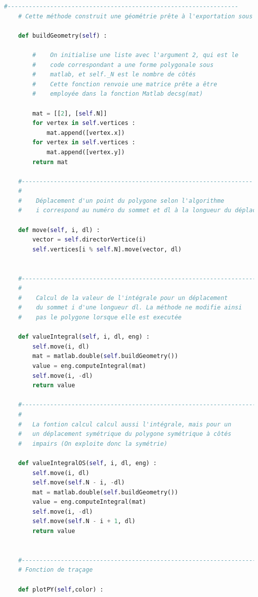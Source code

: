 \documentclass[a4paper,reqno]{article}
\begin{document}
\begin{lstlisting}[language=Python,frame=single,caption=Création de la classe Polygon]
    #-----------------------------------------------------------------
    # Cette méthode construit une géométrie prête à l'exportation sous matlab

    def buildGeometry(self) :

        #    On initialise une liste avec l'argument 2, qui est le 
        #    code correspondant a une forme polygonale sous 
        #    matlab, et self._N est le nombre de côtés
 		#    Cette fonction renvoie une matrice prête a être 
 		#    employée dans la fonction Matlab decsg(mat)

        mat = [[2], [self.N]]
        for vertex in self.vertices :
            mat.append([vertex.x])
        for vertex in self.vertices :
            mat.append([vertex.y])
        return mat

    #-----------------------------------------------------------------
    #
    #    Déplacement d'un point du polygone selon l'algorithme
    #    i correspond au numéro du sommet et dl à la longueur du déplacement

    def move(self, i, dl) :
        vector = self.directorVertice(i)
        self.vertices[i % self.N].move(vector, dl)


    #------------------------------------------------------------------
    #
    #    Calcul de la valeur de l'intégrale pour un déplacement
    #    du sommet i d'une longueur dl. La méthode ne modifie ainsi
    #    pas le polygone lorsque elle est executée

    def valueIntegral(self, i, dl, eng) :
        self.move(i, dl)
        mat = matlab.double(self.buildGeometry())
        value = eng.computeIntegral(mat)
        self.move(i, -dl)
        return value

    #-------------------------------------------------------------------
    #
    #   La fontion calcul calcul aussi l'intégrale, mais pour un
    #   un déplacement symétrique du polygone symétrique à côtés
    #   impairs (On exploite donc la symétrie)

    def valueIntegralOS(self, i, dl, eng) :
        self.move(i, dl)
        self.move(self.N - i, -dl)
        mat = matlab.double(self.buildGeometry())
        value = eng.computeIntegral(mat)
        self.move(i, -dl)
        self.move(self.N - i + 1, dl)
        return value


    #--------------------------------------------------------------------
    # Fonction de traçage

    def plotPY(self,color) :


\end{lstlisting}
\end{document}
